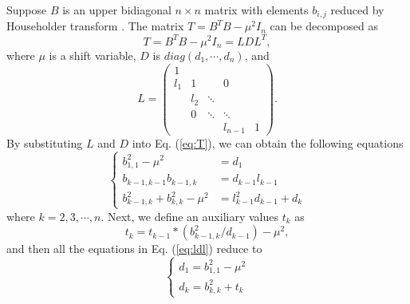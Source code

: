 Suppose $B$ is an upper bidiagonal $n \times n$ matrix with elements $b_{i,j}$ reduced by Householder transform \cite{10householder}.
The matrix $T = B^T B - \mu^2 I_n$ can be decomposed as
\begin{equation}
\label{eq:T}
T = B^T B - \mu^2 I_n = L D L^T ,
\end{equation}
where $\mu$ is a shift variable, $D$ is $diag(d_{1}, \cdots, d_{n})$, and 
\begin{equation}
 L =  \left( \begin{array}{ccccc}
     1&      &       &        &  \\
 l_{1}& 1    &       & 0      &  \\
      & l_{2}& \ddots&        &  \\
      & 0    & \ddots& \ddots &  \\
      &      &       & l_{n-1}& 1
\end{array} \right) .
\label{eq:l}
\end{equation}
By substituting $L$ and $D$ into Eq. (\ref{eq:T}), we can obtain the following equations
\begin{equation}
\left \{
\begin{aligned}
b_{1,1}^2 - \mu^2 &= d_1\\
b_{k-1,k-1} b_{k-1,k} &= d_{k-1} l_{k-1}\\
b_{k-1,k}^2 + b_{k,k}^2 - \mu^2 &= l_{k-1}^2 d_{k-1} + d_k
\end{aligned}
\right .
\label{eq:ldl}
\end{equation}
where $k = 2,3,\cdots,n$.
Next, we define an auxiliary values $t_{k}$ as
\begin{equation}
t_{k} = t_{k-1} * (b_{k-1,k}^2 / d_{k-1}) - \mu^2 ,
\label{eq:tmp}
\end{equation}
and then all the equations in Eq. (\ref{eq:ldl}) reduce to
\begin{equation}
\left \{
\begin{aligned}
d_1 = b_{1,1}^2 - \mu^2 \\
d_k = b_{k,k}^2 + t_{k}
\end{aligned}
\right .
\label{eq:negcount}
\end{equation}

